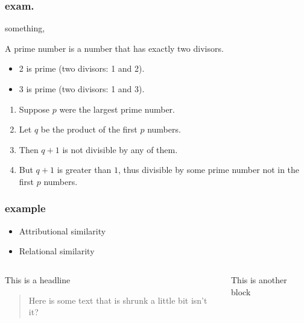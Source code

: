 \documentclass{beamer}
\begin{document}
	\begin{frame}
		\frametitle{exam.}
		something,
		\begin{definition}
		     A \alert{prime number} is a number that has exactly two divisors.
	        \end{definition}
		\begin{itemize}
		\item 2 is prime (two divisors: 1 and 2).
			\pause
	        \item 3 is prime (two divisors: 1 and 3).
		\end{itemize}

		\begin{enumerate}
				\item<1-> Suppose $p$ were the largest prime number.
				\item<2-> Let $q$ be the product of the first $p$ numbers.
				\item<3-> Then $q + 1$ is not divisible by any of them.
			        \item<1-> But $q + 1$ is greater than $1$, thus divisible by some prime 
					number not in the first $p$ numbers.\qedhere
		\end{enumerate}

	\end{frame}

	\begin{frame}
		\frametitle{example}
		\begin{itemize}
		\item Attributional similarity
		\bigskip
		\item Relational similarity
			\cite{Lin2009} %
		\end{itemize}
		\begin{columns}[t]
			    \begin{column}{0.49\textwidth}
				          \begin{block}{This is a headline}
						          \begin{quote}
								Here is some text that is shrunk a little bit isn't it?
							  \end{quote}
				          \end{block}
	      		     \end{column}			
			     \begin{column}{0.49\textwidth}
		             \begin{block}{}
			      This is another block
			     \end{block}
			     \end{column}
		\end{columns}
	        \end{frame}

		\begin{frame}
			\printbibliography %
		\end{frame}
        
\end{document}
